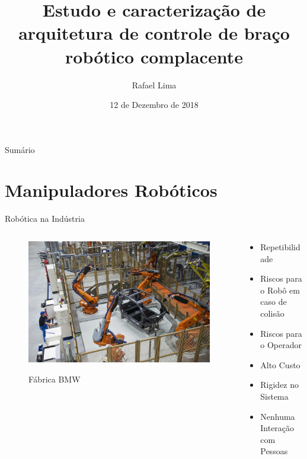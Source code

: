 \documentclass{beamer}
\title{Estudo e caracterização de arquitetura de controle de braço robótico complacente}
\date{12 de Dezembro de 2018}
\author{Rafael Lima}
\institute{Universidade de Brasília}
\begin{document}
\maketitle

\begin{frame}{Sumário}
\tableofcontents
\end{frame}


\section{Manipuladores Robóticos}

\begin{frame}{Robótica na Indústria}
\begin{columns}
\begin{column}{0.5\textwidth}
   \begin{figure}
    \centering
    \includegraphics[width = 1.1\linewidth]{tex/figs/robot-factory.jpg}
    \label{fig:mekainside}
    \caption{Fábrica BMW }
\end{figure}
\end{column}
\begin{column}{0.5\textwidth}  %
    \begin{itemize}
        \item Repetibilidade
        \item Riscos para o Robô em caso de colisão
        \item Riscos para o Operador
        \item Alto Custo
        \item Rigidez no Sistema
        \item Nenhuma Interação com Pessoas
    \end{itemize}
\end{column}
\end{columns}
\end{frame}
\end{document}
